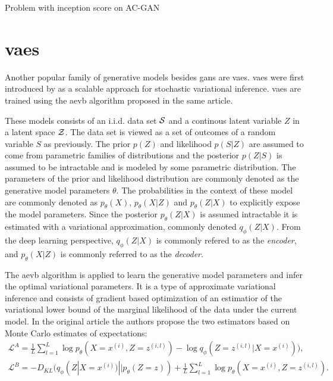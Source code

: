 Problem with inception score on AC-GAN \textcite{shuac2017acganisbad}



\section{\acrlong{vaes}}
Another popular family of generative models besides \acrshort{gans} are \acrfull{vaes}. \acrlong{vaes} were first introduced by \textcite{kingma2013auto} as a scalable approach for stochastic variational inference. \acrshort{vaes} are trained using the \acrfull{aevb} algorithm proposed in the same article. 

These models consists of an i.i.d. data set $\mathcal{S}$ and a continous latent variable $Z$ in a latent space $\mathcal{Z}$. The data set is viewed as a set of outcomes of a random variable $S$ as previously. The prior $p(Z)$ and likelihood $p(S|Z)$ are assumed to come from parametric families of distributions and the posterior $p(Z|S)$ is assumed to be intractable and is modeled by some parametric distribution. The parameters of the prior and likelihood distribution are commonly denoted as the generative model parameters $\theta$. The probabilities in the context of these model are commonly denoted as $p_\theta(X)$, $p_\theta(X|Z)$ and $p_\theta(Z|X)$ to explicitly expose the model parameters. Since the posterior $p_\theta(Z|X)$ is assumed intractable it is estimated with a variational approximation, commonly denoted $q_\phi(Z|X)$. From the deep learning perspective, $q_\phi(Z|X)$ is commonly refered to as the \textit{encoder}, and $p_\theta(X|Z)$ is commonly referred to as the \textit{decoder}.

The \acrshort{aevb} algorithm is applied to learn the generative model parameters and infer the optimal variational parameters. It is a type of approximate variational inference and consists of gradient based optimization of an estimatior of the variational lower bound of the marginal likelihood of the data under the current model. In the original article the authors propose the two estimators based on Monte Carlo estimates of expectations:
\begin{equation}
    \begin{aligned}
        \mathcal{L}^A = \frac{1}{L}\sum_{l=1}^L \log p_\theta (X=x^{(i)},Z=z^{(i, l)}) - \log q_\phi (Z=z^{(i, l)} | X=x^{(i)}) ), \\
        \mathcal{L}^B = - D_{KL}(q_\phi (Z | X=x^{(i)}) || p_\theta(Z=z)) + \frac{1}{L}\sum_{l=1}^L \log p_\theta (X=x^{(i)},Z=z^{(i, l)}).
    \end{aligned}
\end{equation}

